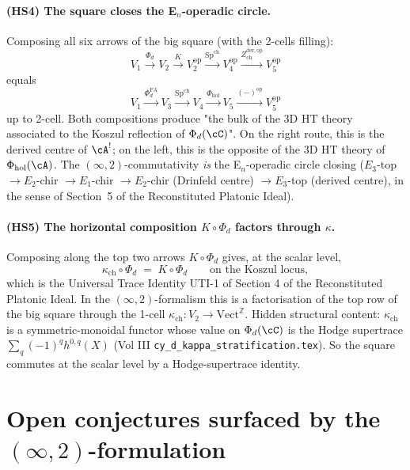 \paragraph*{(HS4) The square closes the E$_n$-operadic circle.} Composing
all six arrows of the big square (with the 2-cells filling):
\[
V_1 \xrightarrow{\Phi_d} V_2 \xrightarrow{K} V_2^{\mathrm{op}}
\xrightarrow{\mathrm{Sp}^{\mathrm{ch}}} V_4^{\mathrm{op}}
\xrightarrow{Z^{\mathrm{der},\mathrm{op}}_{\mathrm{ch}}}
V_5^{\mathrm{op}}
\]
equals
\[
V_1 \xrightarrow{\Phi^{\mathrm{FA}}_d} V_3
\xrightarrow{\mathrm{Sp}^{\mathrm{ch}}} V_4
\xrightarrow{\Phi_{\mathrm{hol}}} V_5 \xrightarrow{(-)^{\mathrm{op}}}
V_5^{\mathrm{op}}
\]
up to 2-cell. Both compositions produce "the bulk of the 3D HT theory
associated to the Koszul reflection of $\Phi_d(\cC)$". On the right
route, this is the derived centre of $\cA^!$; on the left, this is
the opposite of the 3D HT theory of $\Phi_{\mathrm{hol}}(\cA)$. The
$(\infty,2)$-commutativity \emph{is} the E$_n$-operadic circle closing
($E_3$-top $\to E_2$-chir $\to E_1$-chir $\to E_2$-chir (Drinfeld
centre) $\to E_3$-top (derived centre), in the sense of
Section~5 of the Reconstituted Platonic Ideal).

\paragraph*{(HS5) The horizontal composition $K\circ\Phi_d$ factors
through $\kappa$.} Composing along the top two arrows
$K\circ\Phi_d$ gives, at the scalar level,
\[
\kappa_{\mathrm{ch}} \circ \Phi_d \;=\; K\circ\Phi_d
\qquad \text{on the Koszul locus},
\]
which is the Universal Trace Identity UTI-1 of Section 4 of the
Reconstituted Platonic Ideal. In the $(\infty,2)$-formalism this is a
factorisation of the top row of the big square through the 1-cell
$\kappa_{\mathrm{ch}}\colon V_2\to\mathrm{Vect}^{\mathbb{Z}}$. Hidden
structural content: $\kappa_{\mathrm{ch}}$ is a
symmetric-monoidal functor whose value on $\Phi_d(\cC)$ is the
Hodge supertrace $\sum_q (-1)^q h^{0,q}(X)$ (Vol III
\texttt{cy\_d\_kappa\_stratification.tex}). So the square commutes at
the scalar level by a Hodge-supertrace identity.


\section*{Open conjectures surfaced by the $(\infty,2)$-formulation}

